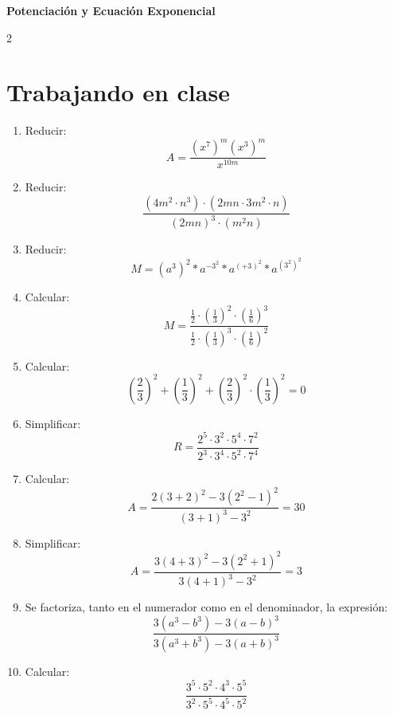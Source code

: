\documentclass[10pt]{article}
\begin{document}
\begin{center}
	\Large\bfseries Potenciación y Ecuación Exponencial
\end{center}

\begin{multicols}{2}
	\section*{Trabajando en clase}
	\begin{enumerate}[label=\textbf{\arabic*.}, itemsep=0.4cm]
		\item Reducir:
		      $$
			      A =  \frac{(x^7)^m(x^3)^m}{x^{10m}}
		      $$

		\item Reducir:
		      $$
			      \frac{(4m^2 \cdot n^3) \cdot (2mn \cdot 3m^2 \cdot n)}{(2mn)^3 \cdot (m^2n)}
		      $$
		\item Reducir:
		      $$
			      M = (a^3)^2*a^{-3^2}*a^{(+3)^2}*a^{(3^2)^2}
		      $$

		\item Calcular:
		      $$
			      M = \frac{\frac{1}{2} \cdot \left( \frac{1}{3} \right)^2 \cdot \left( \frac{1}{6} \right)^3}{\frac{1}{2} \cdot \left( \frac{1}{3} \right)^3 \cdot \left( \frac{1}{6} \right)^2}
		      $$

		\item Calcular:
		      $$
			      \left( \frac{2}{3} \right)^2 + \left( \frac{1}{3} \right)^2 + \left( \frac{2}{3} \right)^2 \cdot \left( \frac{1}{3} \right)^2 = 0
		      $$

		\item Simplificar:
		      $$
			      R = \frac{2^5 \cdot 3^2 \cdot 5^4 \cdot 7^2}{2^3 \cdot 3^4 \cdot 5^2 \cdot 7^4}
		      $$

		\item Calcular:
		      $$
			      A = \frac{2(3 + 2)^2 - 3(2^2 - 1)^2}{(3 + 1)^3 - 3^2} = 30
		      $$

		\item Simplificar:
		      $$
			      A = \frac{3(4 + 3)^2 - 3(2^2 + 1)^2}{3(4 + 1)^3 - 3^2} = 3
		      $$

		\item Se factoriza, tanto en el numerador como en el denominador, la expresión:
		      $$
			      \frac{3(a^3 - b^3) - 3(a - b)^3}{3(a^3 + b^3) - 3(a + b)^3}
		      $$

		\item Calcular:
		      $$
			      \frac{3^5 \cdot 5^2 \cdot 4^3 \cdot 5^5}{3^2 \cdot 5^5 \cdot 4^5 \cdot 5^2}
		      $$


\end{enumerate}
\end{multicols}
\end{document}
